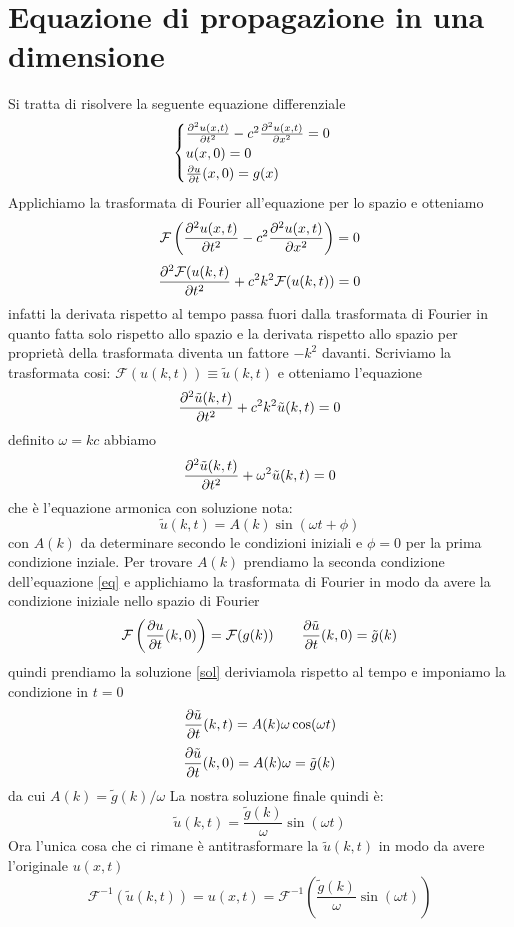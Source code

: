 \section{Equazione di propagazione in una dimensione}
Si tratta di risolvere la seguente equazione differenziale
\begin{equation}
\label{eq}
\begin{cases}
    \frac{\partial^2 u(x,t)}{\partial t^2}-c^2\frac{\partial^2 u(x,t)}{\partial x^2}=0  \\
   u(x,0) = 0\\
   \frac{\partial u}{\partial t}(x,0) = g(x)
  \end{cases} 
\end{equation}
Applichiamo la trasformata di Fourier all'equazione per lo spazio e otteniamo
\[\mathcal{F}\left(\frac{\partial^2 u(x,t)}{\partial t^2}-c^2\frac{\partial^2 u(x,t)}{\partial x^2}\right) = 0\]
\[\frac{\partial^2 \mathcal{F}(u(k,t)}{\partial t^2}+c^2k^2\mathcal{F}(u(k,t)) =0\]
infatti la derivata rispetto al tempo passa fuori dalla trasformata di Fourier in quanto fatta solo rispetto allo spazio e la derivata rispetto allo spazio per proprietà della trasformata diventa un fattore $-k^2$ davanti. Scriviamo la trasformata cosi: $\mathcal{F}(u(k,t)) \equiv \tilde{u}(k,t)$ e otteniamo l'equazione
\[\frac{\partial^2 \tilde{u}(k,t)}{\partial t^2}+c^2k^2\tilde{u}(k,t)=0\]
definito $\omega = kc$ abbiamo
\[\frac{\partial^2 \tilde{u}(k,t)}{\partial t^2}+\omega^2\tilde{u}(k,t)=0\]
che è l'equazione armonica con soluzione nota:
\begin{equation}
\label{sol}
\tilde{u}(k,t) = A(k)\sin(\omega t+\phi)
\end{equation}
con $A(k)$ da determinare secondo le condizioni iniziali e $\phi=0$ per la prima condizione inziale. Per trovare $A(k)$ prendiamo la seconda condizione dell'equazione \eqref{eq} e applichiamo la trasformata di Fourier in modo da avere la condizione iniziale nello spazio di Fourier
\[\mathcal{F}\left(\frac{\partial u}{\partial t}(k,0)\right) = \mathcal{F}(g(k)) \qquad \frac{\partial \tilde{u}}{\partial t}(k,0) = \tilde{g}(k)\]
quindi prendiamo la soluzione \eqref{sol} deriviamola rispetto al tempo e imponiamo la condizione in $t=0$
\[\frac{\partial \tilde{u}}{\partial t}(k,t) = A(k)\omega \cos(\omega t)\]
\[\frac{\partial \tilde{u}}{\partial t}(k,0) =A(k)\omega = \tilde{g}(k) \]
da cui $A(k) = \tilde{g}(k)/\omega$
La nostra soluzione finale quindi è:
\[\tilde{u}(k,t) = \frac{\tilde{g}(k)}{\omega}\sin(\omega t)\]
Ora l'unica cosa che ci rimane è antitrasformare la $\tilde{u}(k,t)$ in modo da avere l'originale $u(x,t)$
\begin{equation}\label{f}
\mathcal{F}^{-1}(\tilde{u}(k,t)) = u(x,t) = \mathcal{F}^{-1}\left(\frac{\tilde{g}(k)}{\omega}\sin(\omega t)\right)
\end{equation}
